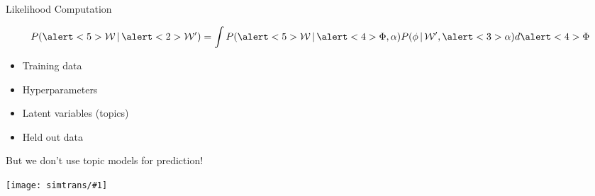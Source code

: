\documentclass[compress]{beamer}
\newcommand{\g}{\, | \,}
\newcommand{\gfxs}[2]{
\begin{center}
	\texttt{[image: simtrans/\#1]}
\end{center}
}
\begin{document}
\begin{frame}{Likelihood Computation}

  \begin{equation}
    P(\alert<5>{\mathcal{W}} \g \alert<2>{\mathcal{W}'}) = \int{ P( \alert<5>{\mathcal{W}} \g \alert<4>{\Phi},
      \alpha ) P(\phi \g \mathcal{W'}, \alert<3>{\alpha}) d\alert<4>{\Phi} } 
  \end{equation}

  \begin{itemize}
  \item \alert<2>{Training data}
    \item \alert<3>{Hyperparameters}
    \item \alert<4>{Latent variables (topics)}
      \item \alert<5>{Held out data}
  \end{itemize}
  
\end{frame}


\begin{frame}{But we don't use topic models for prediction!}

\gfxs{autocomplete}{.8}

\end{frame}
\end{document}
